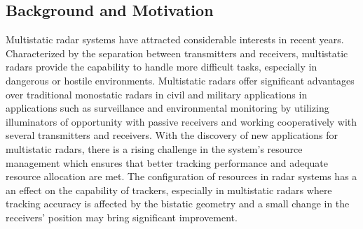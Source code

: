 \documentclass[12pt,journal,draftclsnofoot,onecolumn]{IEEEtran}
\begin{document}
\subsection{Background and Motivation}
Multistatic radar systems have attracted considerable interests in recent years. Characterized by the separation between transmitters and receivers, multistatic radars provide the capability to handle more difficult tasks, %
 especially in dangerous or hostile environments. %
Multistatic radars offer significant advantages over traditional monostatic radars in civil and military applications in applications such as surveillance and environmental monitoring by utilizing illuminators of opportunity with passive receivers and working cooperatively with several transmitters and receivers\cite{handel1986survey}. %
With the discovery of new applications for multistatic radars, there is a rising challenge in the system's resource management which ensures that better tracking performance and adequate resource allocation are met. The configuration of resources in radar systems has a an effect on the capability of trackers, especially in multistatic radars where tracking accuracy is affected by the bistatic geometry and a small change in the receivers' position may bring significant improvement.
\end{document}
